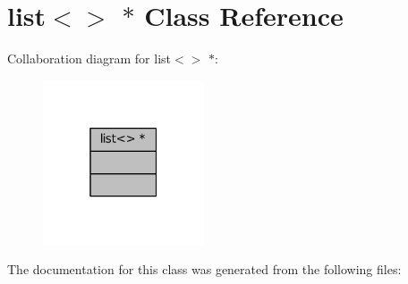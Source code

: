 \hypertarget{classmpl_1_1list_3_4_01_5}{}\section{list$<$$>$ $\ast$ Class Reference}
\label{classmpl_1_1list_3_4_01_5}


Collaboration diagram for list$<$$>$ $\ast$\+:
\nopagebreak
\begin{figure}[H]
\begin{center}
\leavevmode
\includegraphics[width=135pt]{classmpl_1_1list_3_4_01_5__coll__graph}
\end{center}
\end{figure}


The documentation for this class was generated from the following files\+: